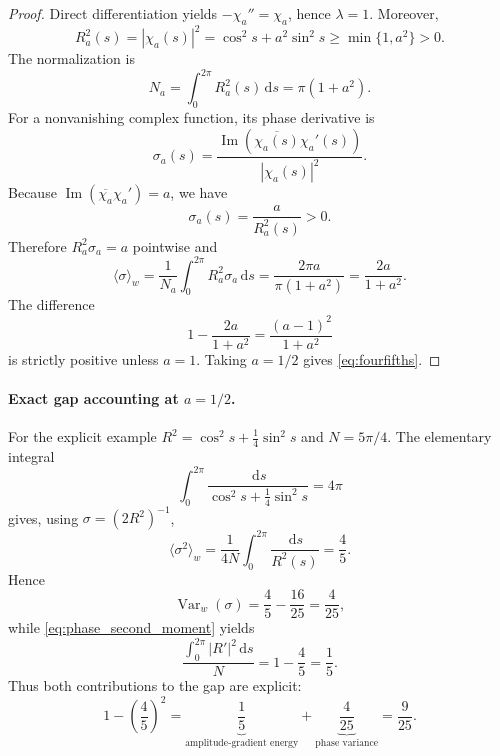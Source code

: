 \documentclass[11pt]{article}
\newcommand{\dd}{\,\mathrm{d}}
\newcommand{\avg}[1]{\langle #1\rangle_w}
\newcommand{\Var}{\operatorname{Var}}
\begin{document}
\begin{proof}
Direct differentiation yields $-\chi_a''=\chi_a$, hence $\lambda=1$.
Moreover,
\begin{equation}
    R_a^2(s)=|\chi_a(s)|^2=\cos^2s+a^2\sin^2s
    \ge\min\{1,a^2\}>0.
\end{equation}
The normalization is
\begin{equation}
    N_a=\int_0^{2\pi}R_a^2(s)\dd s=\pi(1+a^2).
\end{equation}
For a nonvanishing complex function, its phase derivative is
\begin{equation}
    \sigma_a(s)=\frac{\operatorname{Im}
    (\overline{\chi_a(s)}\chi_a'(s))}{|\chi_a(s)|^2}.
\end{equation}
Because $\operatorname{Im}(\overline{\chi_a}\chi_a')=a$,
we have
\begin{equation}\label{eq:sigmaa}
    \sigma_a(s)=\frac{a}{R_a^2(s)}>0.
\end{equation}
Therefore $R_a^2\sigma_a=a$ pointwise and
\begin{equation}
    \avg{\sigma}
      =\frac{1}{N_a}\int_0^{2\pi}R_a^2\sigma_a\dd s
      =\frac{2\pi a}{\pi(1+a^2)}
      =\frac{2a}{1+a^2}.
\end{equation}
The difference
\begin{equation}
    1-\frac{2a}{1+a^2}=\frac{(a-1)^2}{1+a^2}
\end{equation}
is strictly positive unless $a=1$.  Taking $a=1/2$ gives
\eqref{eq:fourfifths}.
\end{proof}

\paragraph{Exact gap accounting at $a=1/2$.}
For the explicit example $R^2=\cos^2s+\tfrac14\sin^2s$ and
$N=5\pi/4$.  The elementary integral
\begin{equation}
    \int_0^{2\pi}\frac{\dd s}
    {\cos^2s+\frac14\sin^2s}=4\pi
\end{equation}
gives, using $\sigma=(2R^2)^{-1}$,
\begin{equation}
    \avg{\sigma^2}
      =\frac{1}{4N}\int_0^{2\pi}\frac{\dd s}{R^2(s)}
      =\frac45.
\end{equation}
Hence
\begin{equation}
    \Var_w(\sigma)=\frac45-\frac{16}{25}=\frac4{25},
\end{equation}
while \eqref{eq:phase_second_moment} yields
\begin{equation}
    \frac{\int_0^{2\pi}|R'|^2\dd s}{N}
      =1-\frac45=\frac15.
\end{equation}
Thus both contributions to the gap are explicit:
\begin{equation}\label{eq:gap_accounting}
    \boxed{
    1-\left(\frac45\right)^2
       =\underbrace{\frac15}_{\text{amplitude-gradient energy}}
       +\underbrace{\frac4{25}}_{\text{phase variance}}
       =\frac9{25}.}
\end{equation}
\end{document}

